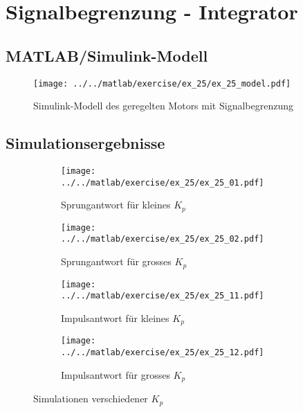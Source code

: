 \section{Signalbegrenzung - Integrator}

\subsection{MATLAB/Simulink-Modell}

\begin{figure}[h!]
	\centering
	\texttt{[image: ../../matlab/exercise/ex\_25/ex\_25\_model.pdf]}
	\caption{Simulink-Modell des geregelten Motors mit Signalbegrenzung}
\end{figure}

\subsection{Simulationsergebnisse}
\begin{figure}[h!]
	\centering
	\begin{subfigure}{0.45\textwidth}
		\texttt{[image: ../../matlab/exercise/ex\_25/ex\_25\_01.pdf]}
		\caption{Sprungantwort für kleines $K_p$}
		\label{fig:ex_25_01}
	\end{subfigure}
	\hfill{}
	\begin{subfigure}{0.45\textwidth}
		\texttt{[image: ../../matlab/exercise/ex\_25/ex\_25\_02.pdf]}
		\caption{Sprungantwort für grosses $K_p$}
	\end{subfigure}
	
	\begin{subfigure}{0.45\textwidth}
		\texttt{[image: ../../matlab/exercise/ex\_25/ex\_25\_11.pdf]}
		\caption{Impulsantwort für kleines $K_p$}
		\label{fig:ex_25_11}
	\end{subfigure}
	\hfill{}
	\begin{subfigure}{0.45\textwidth}
		\texttt{[image: ../../matlab/exercise/ex\_25/ex\_25\_12.pdf]}
		\caption{Impulsantwort für grosses $K_p$}
	\end{subfigure}


	\caption{Simulationen verschiedener $K_p$}
\end{figure}
